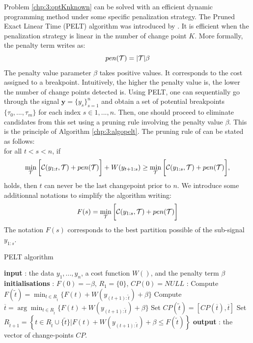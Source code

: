 Problem \ref{chp:3:optKnknown} can be solved with an efficient dynamic programming method under some specific penalization strategy. The Pruned Exact Linear Time (PELT) algorithm was introduced by \cite{Killick2012}. It is efficient when the penalization strategy is linear in the number of change point $K$. More formally, the penalty term writes as:
$$pen({\mathcal T}) = \lvert{\mathcal T}\rvert\beta$$ 
The penalty value parameter $\beta$ takes positive values. It corresponds to the cost assigned to a breakpoint. Intuitively, the higher the penalty value is, the lower the number of change points detected is. Using PELT, one can sequentially go through the signal $\bm y = \{y_s\}_{s=1}^n$ and obtain a set of potential breakpoints $\{\tau_0,...,\tau_m\}$ for each index $s \in {1,...,n}$. Then, one should proceed to eliminate candidates from this set using a pruning rule involving the penalty value $\beta$. This is the principle of Algorithm \ref{chp:3:algopelt}. The pruning rule of \cite{Killick2012} can be stated as follows: \\
 for all $t <s < n$, if
\begin{equation}\label{chp:3:pruning}
 \min_{{\mathcal T}}\bigg[{\mathcal C}(y_{1:t},{\mathcal T})+pen({\mathcal T})\bigg] + W(y_{t+1:s}) \geq \min_{{\mathcal T}}\bigg[{\mathcal C}(y_{1:s},{\mathcal T})+pen({\mathcal T})\bigg], 
\end{equation}
holds, then $t$ can never be the last changepoint prior to $n$. We introduce some additionnal notations to simplify the algorithm writing:  
$$F(s) = \min_{{\mathcal T}}\bigg[{\mathcal C}(y_{1:s},{\mathcal T})+pen({\mathcal T})\bigg]$$
The notation $F(s)$ corresponds to the best partition possible of the sub-signal $y_{1:s}$. 
\begin{algorithm}[ht]
\caption{PELT algorithm}\label{chp:3:algopelt}
\begin{algorithmic}
\State \textbf{input} : the data $y_{1},...,y_{n}$, a cost function $W()$, and the penalty term $\beta$ \\
  \State \textbf{initialisations} : $F(0)=-\beta$, $R_{1}=\lbrace 0\rbrace$, $CP(0)=NULL$  
   :
  \State Compute 
  $ F(\tilde t)=\min_{t\in R_{\tilde t}}\lbrace F(t)+W(y_{(t+1):\tilde t})+\beta\rbrace $
  \State Compute $ \overline t=\arg \min_{t\in R_{\tilde t}}\lbrace F(t)+W(y_{(t+1):\tilde t})+\beta\rbrace $ 
  \State Set $CP(\tilde t)=[CP(\overline t), \overline t]$
  \State Set $R_{\tilde t+1}=\left\{t\in R_{\tilde t}\cup \lbrace\tilde t\rbrace \vert F(t)+W(y_{(t+1):\tilde t}) +\beta \le F(\tilde t)   \right\}$ 
\EndFor 
\State \textbf{output} : the vector of change-points $CP$. 
\end{algorithmic}
\end{algorithm} 

